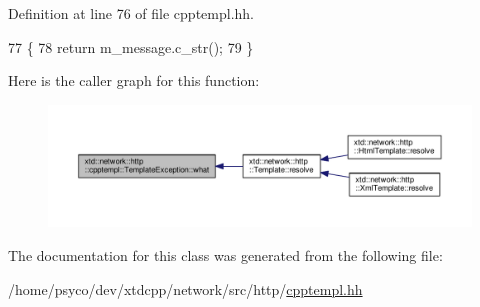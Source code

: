 Definition at line 76 of file cpptempl.\+hh.


\begin{DoxyCode}
77   \{
78     \textcolor{keywordflow}{return} m\_message.c\_str();
79   \}
\end{DoxyCode}


Here is the caller graph for this function\+:
\nopagebreak
\begin{figure}[H]
\begin{center}
\leavevmode
\includegraphics[width=350pt]{classxtd_1_1network_1_1http_1_1cpptempl_1_1TemplateException_ae7f1bb4b84c8689b502cdbaa0954ed41_icgraph}
\end{center}
\end{figure}




The documentation for this class was generated from the following file\+:\begin{DoxyCompactItemize}
\item 
/home/psyco/dev/xtdcpp/network/src/http/\hyperlink{cpptempl_8hh}{cpptempl.\+hh}\end{DoxyCompactItemize}
